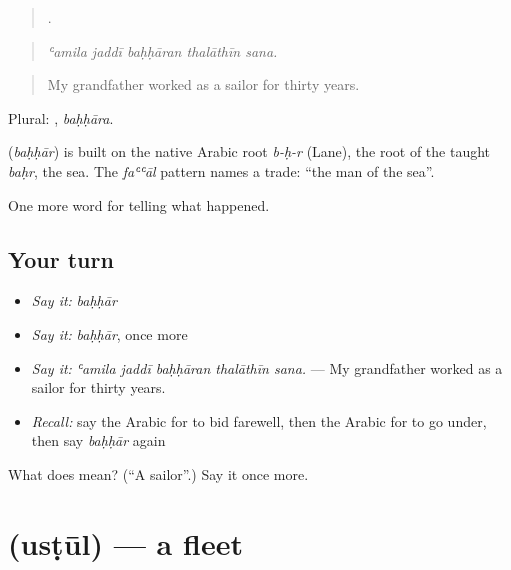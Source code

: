 \begin{quote}
    .
\end{quote}

\begin{quote}
\emph{ʿamila jaddī baḥḥāran thalāthīn sana.}
\end{quote}

\begin{quote}
My grandfather worked as a sailor for thirty years.
\end{quote}

Plural: , \emph{baḥḥāra}.

\begin{cousinweb}
\textbf{} (\emph{baḥḥār}) is built on the native Arabic root \emph{b-ḥ-r} (Lane), the root of the taught \emph{baḥr}, the sea. The \emph{faʿʿāl} pattern names a trade: \textquotedblleft{}the man of the sea\textquotedblright{}.
\end{cousinweb}

\begin{grammarlens}[title={What you've built}]
One more word for telling what happened.
\end{grammarlens}

\subsection*{Your turn}
\begin{itemize}
\raggedright
  \item \emph{Say it:} \emph{baḥḥār}
  \item \emph{Say it:} \emph{baḥḥār}, once more
  \item \emph{Say it:} \emph{ʿamila jaddī baḥḥāran thalāthīn sana.} — My grandfather worked as a sailor for thirty years.
  \item \emph{Recall:} say the Arabic for to bid farewell, then the Arabic for to go under, then say \emph{baḥḥār} again
\end{itemize}

\begin{tcolorbox}[breakable,colback=teal!4,colframe=teal!35!black,title={Before you move on}]
What does  mean? (\textquotedblleft{}A sailor\textquotedblright{}.) Say it once more.
\end{tcolorbox}
\section[\texorpdfstring{\ar{أسطول} (usṭūl)}{أسطول (usṭūl)}]{ (usṭūl) — a fleet}


